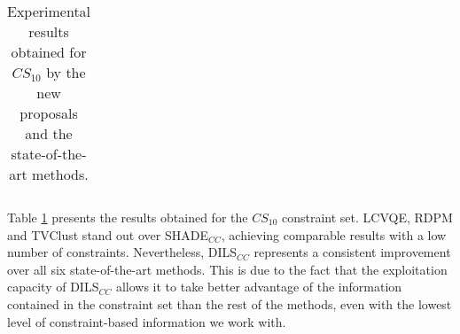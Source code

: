 \begin{table}[!h]
{\begin{tabular}{lcccccccc}
	\end{tabular}}
	
	\caption{Experimental results obtained for $CS_{10}$ by the new proposals and the state-of-the-art methods.}
	\label{tab:resultsSOTA10}
\end{table}

Table \ref{tab:resultsSOTA10} presents the results obtained for the $CS_{10}$ constraint set. \acs{LCVQE}, \acs{RDPM} and \acs{TVClust} stand out over \acs{SHADE}$_{CC}$, achieving comparable results with a low number of constraints. Nevertheless, \acs{DILS}$_{CC}$ represents a consistent improvement over all six state-of-the-art methods. This is due to the fact that the exploitation capacity of \acs{DILS}$_{CC}$ allows it to take better advantage of the information contained in the constraint set than the rest of the methods, even with the lowest level of constraint-based information we work with.

